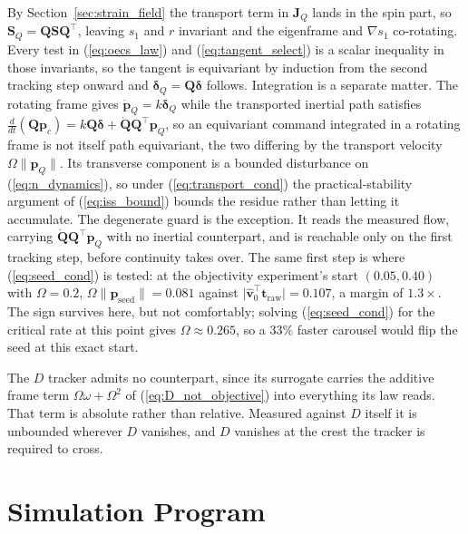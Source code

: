 \documentclass[lettersize,journal]{IEEEtran}
\begin{document}
\begin{IEEEproof}
By Section~\ref{sec:strain_field} the transport term in $\mathbf{J}_Q$ lands in the
spin part, so $\mathbf{S}_Q = \mathbf{Q}\mathbf{S}\mathbf{Q}^\top$,
leaving $s_1$ and $r$ invariant and the eigenframe and $\nabla s_1$
co-rotating. Every test in (\ref{eq:oecs_law}) and
(\ref{eq:tangent_select}) is a scalar inequality in those invariants, so
the tangent is equivariant by induction from the second tracking step
onward and $\boldsymbol{\delta}_Q = \mathbf{Q}\boldsymbol{\delta}$
follows. Integration is a separate matter. The rotating frame gives
$\dot{\mathbf{p}}_Q = k\boldsymbol{\delta}_Q$ while the transported
inertial path satisfies $\tfrac{d}{dt}(\mathbf{Q}\mathbf{p}_c) =
k\mathbf{Q}\boldsymbol{\delta} +
\dot{\mathbf{Q}}\mathbf{Q}^\top\mathbf{p}_Q$, so an equivariant command
integrated in a rotating frame is not itself path equivariant, the two
differing by the transport velocity $\Omega\lVert\mathbf{p}_Q\rVert$.
Its transverse component is a bounded disturbance on
(\ref{eq:n_dynamics}), so under (\ref{eq:transport_cond}) the
practical-stability argument of (\ref{eq:iss_bound}) bounds the residue
rather than letting it accumulate. The degenerate guard is the exception.
It reads the
measured flow, carrying
$\dot{\mathbf{Q}}\mathbf{Q}^\top\mathbf{p}_Q$ with no inertial
counterpart, and is reachable only on the first tracking step, before
continuity takes over. The same first step is where
(\ref{eq:seed_cond}) is tested: at the objectivity experiment's start
$(0.05, 0.40)$ with $\Omega = 0.2$, $\Omega\lVert\mathbf{p}_{\text{seed}}\rVert
= 0.081$ against $\lvert\hat{\mathbf{v}}_0^\top\mathbf{t}_{\text{raw}}\rvert
= 0.107$, a margin of $1.3\times$. The sign survives here, but not
comfortably; solving (\ref{eq:seed_cond}) for the critical rate at this
point gives $\Omega \approx 0.265$, so a $33\%$ faster carousel would
flip the seed at this exact start.
\end{IEEEproof}

The $D$ tracker admits no counterpart, since its surrogate carries the
additive frame term $\Omega\omega + \Omega^2$ of
(\ref{eq:D_not_objective}) into everything its law reads. That term is
absolute rather than relative. Measured against $D$ itself it is
unbounded wherever $D$ vanishes, and $D$ vanishes at the crest the
tracker is required to cross.

\section{Simulation Program}
\label{sec:methods}
\end{document}
